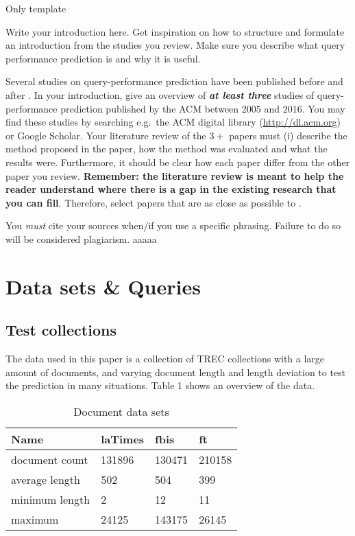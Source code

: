 \documentclass{sig-alternate}
\begin{document}
Only template

Write your introduction here. Get inspiration on how to structure and formulate an introduction from the studies you review. Make sure you describe what query performance prediction is and why it is useful.

Several studies on query-performance prediction have been published before and after \cite{cummins2011improved}. In your introduction, give an overview of \textbf{\emph{at least three}} studies of query-performance prediction published by the ACM between 2005 and 2016. You may find these studies by searching e.g.\ the ACM digital library (\url{http://dl.acm.org}) or Google Scholar. Your literature review of the $3+$ papers must (i) describe the method proposed in the paper, how the method was evaluated and what the results were. Furthermore, it should be clear how each paper differ from the other paper you review. \textbf{Remember: the literature review is meant to help the reader understand where there is a gap in the existing research that you can fill}. Therefore, select papers that are as close as possible to \cite{cummins2011improved}. 

You \emph{must} cite your sources when/if you use a specific phrasing. Failure to do so will be considered plagiarism.
aaaaa
\section{Data sets \& Queries}
\subsection{Test collections}
The data used in this paper is a collection of TREC collections with a large amount of documents, and varying document length and length deviation to test the prediction in many situations. Table 1 shows an overview of the data.  
\begin{table}[h!]
\centering
\caption{Document data sets}
\label{my-label}
\begin{tabular}{|l|l|l|l|}
\hline
Name           & laTimes & fbis   & ft     \\ \hline
document count & 131896  & 130471 & 210158 \\ \hline
average length & 502     & 504    & 399    \\ \hline
minimum length & 2       & 12     & 11     \\ \hline
maximum        & 24125   & 143175 & 26145  \\ \hline
\end{tabular}
\end{table}
\end{document}
